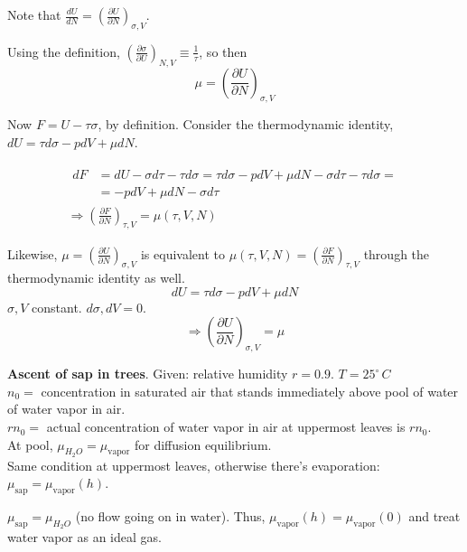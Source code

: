Note that $\frac{ dU}{ dN} = \left( \frac{ \partial U}{ \partial N} \right)_{\sigma, V}$.  

Using the definition, $\left( \frac{ \partial \sigma}{ \partial U} \right)_{N,V} \equiv \frac{1}{\tau}$, so then
\[
\boxed{ \mu = \left( \frac{ \partial U}{ \partial N} \right)_{\sigma, V}}
\]

Now $F = U - \tau \sigma$, by definition.  Consider the thermodynamic identity, $dU = \tau d\sigma - p dV + \mu dN$.  

\[
\begin{gathered}
\begin{aligned}
  dF & = dU - \sigma d\tau - \tau d\sigma = \tau d\sigma - pdV + \mu dN - \sigma d\tau - \tau d\sigma = \\
  & = - pdV + \mu dN - \sigma d\tau
\end{aligned} \\
\Longrightarrow \left( \frac{ \partial F}{ \partial N} \right)_{ \tau, V} = \mu(\tau, V, N)
\end{gathered}
\]

Likewise, $\mu = \left( \frac{   \partial U}{ \partial N} \right)_{\sigma, V}$ is equivalent to $\mu(\tau, V, N) = \left( \frac{ \partial F}{ \partial N} \right)_{\tau, V}$ through the thermodynamic identity as well.  
\[
dU = \tau d\sigma - p dV + \mu dN
\]
$\sigma, V$ constant.  $d\sigma, dV = 0$.  
\[
\Longrightarrow \left( \frac{ \partial U}{\partial N} \right)_{\sigma, V} = \mu 
\]

 \textbf{Ascent of sap in trees}.  Given: relative humidity $r = 0.9$.  $T = 25^{\circ} \, C$ \\

$n_0 = $ concentration in saturated air that stands immediately above pool of water of water vapor in air.  \\
$r n_0 = $ actual concentration of water vapor in air at uppermost leaves is $rn_0$.   \\

At pool, $\mu_{H_2O} = \mu_{\text{vapor}}$ for diffusion equilibrium.   \\

Same condition at uppermost leaves, otherwise there's evaporation: \\
$\mu_{\text{sap}} = \mu_{\text{vapor}}(h)$.  

$\mu_{\text{sap}} = \mu_{H_2O}$ (no flow going on in water).  Thus, $\mu_{\text{vapor}}(h) = \mu_{\text{vapor}}(0)$ and treat water vapor as an ideal gas.  

